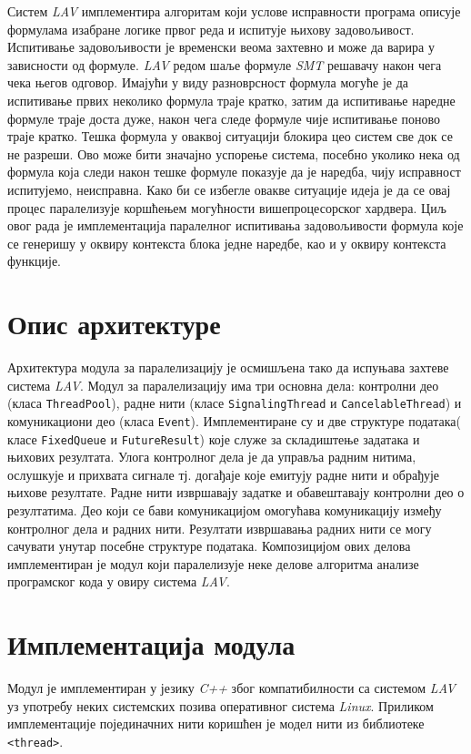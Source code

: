 \documentclass[12pt,oneside]{memoir}
\begin{document}
Систем \textit{LAV} имплементира алгоритам који услове исправности програма описује формулама изабране логике првог реда и испитује њихову задовољивост.  Испитивање задовољивости је  временски веома захтевно и може да варира у зависности од формуле. \textit{LAV} редом шаље формуле \textit{SMT} решавачу након чега чека његов одговор. Имајући у виду разноврсност формула могуће је да испитивање првих неколико формула траје кратко, затим да испитивање наредне формуле траје доста дуже, након чега следе формуле чије испитивање поново траје кратко. Тешка формула у оваквој ситуацији блокира цео систем све док се не разреши. Ово може бити значајно успорење система, посебно уколико нека од формула која следи након тешке формуле показује да је наредба, чију исправност испитујемо, неисправна. 	
Како би се избегле овакве ситуације идеја је да се овај процес паралелизује коршћењем могућности вишепроцесорског хардвера. Циљ овог рада је имплементација паралелног испитивања задовољивости формула које се генеришу у оквиру контекста блока једне наредбе, као и у оквиру контекста функције. 

\section{Опис архитектуре}

Архитектура модула за паралелизацију је осмишљена тако да испуњава захтеве система \textit{LAV}. Модул за паралелизацију има три основна дела: контролни део (класа \texttt{ThreadPool}), радне нити (класе \texttt{SignalingThread} и \texttt{CancelableThread}) и комуникациони део (класа \texttt{Event}). Имплементиране су и две структуре података( класе \texttt{FixedQueue} и \texttt{FutureResult}) које служе за складиштење задатака и њихових резултата. Улога контролног дела је да управља радним нитима, ослушкује и прихвата сигнале тј. догађаје које емитују радне нити и обрађује њихове резултате. Радне нити извршавају задатке и обавештавају контролни део о резултатима. Део који се бави комуникацијом омогућава комуникацију између контролног дела и радних нити. Резултати извршавања радних нити се могу сачувати унутар посебне структуре података. Композицијом ових делова имплементиран је модул који паралелизује неке делове алгоритма анализе програмског кода у овиру система \textit{LAV}. 

\section{Имплементација модула}
Модул је имплементиран у језику \textit{C++} због компатибилности са системом \textit{LAV} уз употребу неких системских позива оперативног система \textit{Linux}. Приликом имплементације појединачних нити коришћен је модел нити из библиотеке \texttt{<thread>}.
\end{document}
